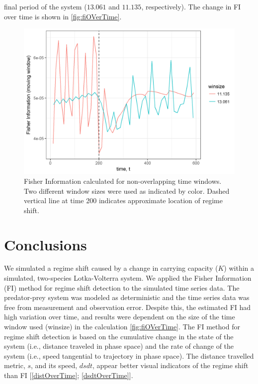\documentclass[12pt,twoside]{reedthesis}
\begin{document}
final period of the system (\(13.061\) and \(11.135\), respectively).
The change in FI over time is shown in \ref{fig:fiOVerTime}.
\begin{figure}
\centering
\includegraphics{./chapterFiles/fiGuide/figures/fiOverTime.png}
\caption{\label{fig:fiOverTime}Fisher Information calculated for
non-overlapping time windows. Two different window sizes were used as
indicated by color. Dashed vertical line at time 200 indicates
approximate location of regime shift.}
\end{figure}
\section{Conclusions}\label{conclusions}

We simulated a regime shift caused by a change in carrying capacity
(\(K\)) within a simulated, two-species Lotka-Volterra system. We
applied the Fisher Information (FI) method for regime shift detection to
the simulated time series data. The predator-prey system was modeled as
deterministic and the time series data was free from measurement and
observation error. Despite this, the estimated FI had high variation
over time, and results were dependent on the size of the time window
used (winsize) in the calculation \ref{fig:fiOVerTime}. The FI method
for regime shift detection is based on the cumulative change in the
state of the system (i.e., distance traveled in phase space) and the
rate of change of the system (i.e., speed tangential to trajectory in
phase space). The distance travelled metric, \(s\), and its speed,
\(dsdt\), appear better visual indicators of the regime shift than FI
{[}\ref{distOverTime}; \ref{dsdtOverTime}{]}.
\end{document}
